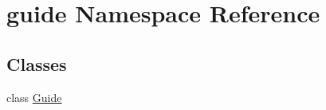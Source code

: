\hypertarget{namespaceguide}{}\section{guide Namespace Reference}
\label{namespaceguide}
\subsection*{Classes}
\begin{DoxyCompactItemize}
\item 
class \hyperlink{classguide_1_1Guide}{Guide}
\end{DoxyCompactItemize}
